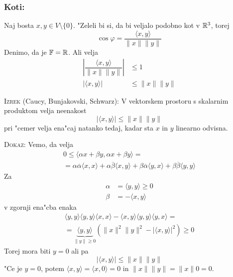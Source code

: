 \subsubsection{Koti:}
Naj bosta $x, y \in V \setminus \{ 0 \}$. "Zeleli bi si, da bi veljalo podobno kot v $\mathbb{R}^3$, torej
\begin{equation*}
\cos \varphi = \dfrac{\langle x, y \rangle}{\| x \| \| y \|}
\end{equation*}
Denimo, da je $\operatorname{\mathbb{F}} = \mathbb{R}$. Ali velja
\begin{align*}
\left| \dfrac{\langle x, y \rangle}{\| x \| \| y \|} \right| &\leq 1 \\
|\langle x, y \rangle| &\leq \| x \| \| y \|
\end{align*}

\textsc{Izrek} (Caucy, Bunjakovski, Schwarz): V vektorskem prostoru s skalarnim produktom velja neenakost
\begin{equation*}
|\langle x, y \rangle| \leq \| x \| \| y \|
\end{equation*}
pri "cemer velja ena"caj natanko tedaj, kadar sta $x$ in $y$ linearno odvisna.

\textsc{Dokaz:} Vemo, da velja
\begin{multline*}
0 \leq \langle \alpha x + \beta y, \alpha x + \beta y \rangle = \\
= \alpha \overline{\alpha} \langle x, x \rangle + \alpha \overline{\beta} \langle x, y \rangle + \beta \overline{\alpha} \langle y, x \rangle + \beta \overline{\beta} \langle y, y \rangle
\end{multline*}
Za
\begin{align*}
\alpha &= \langle y, y \rangle \geq 0 \\
\beta &= - \langle x, y \rangle
\end{align*}
v zgornji ena"cba enaka
\begin{multline*}
\langle y, y \rangle \langle y, y \rangle \langle x, x \rangle - \langle x, y \rangle \langle y, y \rangle \langle y, x \rangle = \\
= \underbrace{ \langle y, y \rangle}_{\| y \| \geq 0} ( \| x \|^2 \| y \|^2 - |\langle x, y \rangle|^2) \geq 0
\end{multline*}
Torej mora biti $y =0$ ali pa
\begin{equation*}
| \langle x, y \rangle| \leq \| x \| \| y \|
\end{equation*}
"Ce je $y = 0$, potem $\langle x, y \rangle = \langle x, 0 \rangle = 0$ in $\|x \| \|y \| = \| x \| 0 = 0$.

